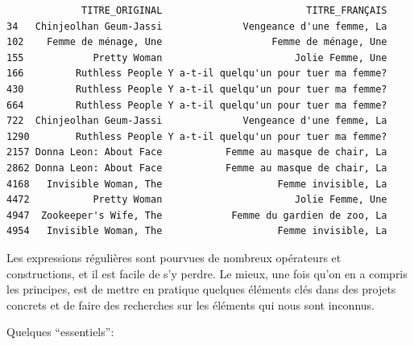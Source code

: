 \documentclass[
  letterpaper,
  DIV=11,
  numbers=noendperiod]{scrartcl}
\begin{document}
\begin{verbatim}
             TITRE_ORIGINAL                         TITRE_FRANÇAIS
34   Chinjeolhan Geum-Jassi              Vengeance d'une femme, La
102    Femme de ménage, Une                   Femme de ménage, Une
155            Pretty Woman                       Jolie Femme, Une
166         Ruthless People Y a-t-il quelqu'un pour tuer ma femme?
430         Ruthless People Y a-t-il quelqu'un pour tuer ma femme?
664         Ruthless People Y a-t-il quelqu'un pour tuer ma femme?
722  Chinjeolhan Geum-Jassi              Vengeance d'une femme, La
1290        Ruthless People Y a-t-il quelqu'un pour tuer ma femme?
2157 Donna Leon: About Face           Femme au masque de chair, La
2862 Donna Leon: About Face           Femme au masque de chair, La
4168   Invisible Woman, The                    Femme invisible, La
4472           Pretty Woman                       Jolie Femme, Une
4947  Zookeeper's Wife, The            Femme du gardien de zoo, La
4954   Invisible Woman, The                    Femme invisible, La
\end{verbatim}

Les expressions régulières sont pourvues de nombreux opérateurs et
constructions, et il est facile de s'y perdre. Le mieux, une fois qu'on
en a compris les principes, est de mettre en pratique quelques éléments
clés dans des projets concrets et de faire des recherches sur les
éléments qui nous sont inconnus.

Quelques ``essentiels'':
\end{document}
